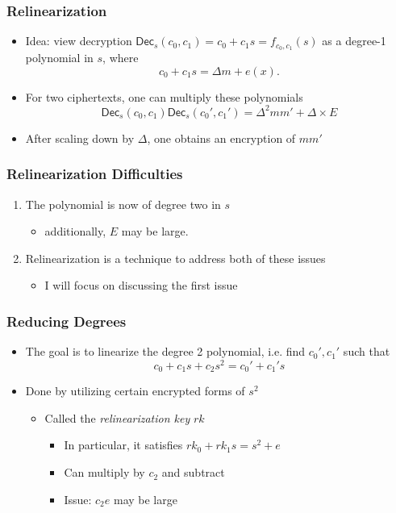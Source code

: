 \documentclass{beamer}
\theoremstyle{definition}
\newcommand{\dec}{\mathsf{Dec}}
\begin{document}
\begin{frame}
	\frametitle{Relinearization}
	\begin{itemize}
		\item Idea: view decryption $\dec_{s}(c_0, c_1) = c_0 + c_1s = f_{c_0,c_1}(s)$ as a degree-1 polynomial in $s$, where
		\begin{equation*}
			c_0+c_1s = \Delta m + e(x).
		\end{equation*}\pause
	\item For two ciphertexts, one can multiply these polynomials
\begin{equation*}
	\dec_s(c_0,c_1)\dec_s(c_0',c_1') = \Delta^2 mm' + \Delta\times E
\end{equation*}	\pause{}
\item After scaling down by $\Delta$, one obtains an encryption of $mm'$
	\end{itemize}
\end{frame}

\begin{frame}
	\frametitle{Relinearization Difficulties}
	\begin{enumerate}
		\item The polynomial is now of degree \alert{two} in $s$\pause
		\begin{itemize}
			\item additionally, $E$ may be large.\pause{}
		\end{itemize}
		\item Relinearization is a technique to address both of these issues\pause
		\begin{itemize}
			\item I will focus on discussing the first issue
		\end{itemize}
	\end{enumerate}
\end{frame}

\begin{frame}
	\frametitle{Reducing Degrees}
	\begin{itemize}
		\item The goal is to \alert{linearize} the degree 2 polynomial, i.e. find $c_0', c_1'$ such that
		\begin{equation*}
			c_0 + c_1s + c_2s^2 = c_0' + c_1's
		\end{equation*}\pause{}
	\item Done by utilizing certain encrypted forms of $s^2$\pause{}
	\begin{itemize}
		\item Called the \emph{relinearization key} $rk$\pause{}
\begin{itemize}
	\item In particular, it satisfies $rk_0 + rk_1s = s^2+e$\pause{}
	\item Can multiply by $c_2$ and subtract\pause{}
	\item Issue: $c_2 e$ may be \alert{large}
\end{itemize}
	\end{itemize}
	\end{itemize}
\end{frame}
\end{document}
